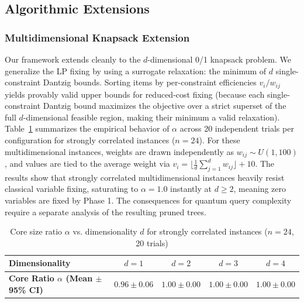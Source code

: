 \documentclass[conference]{IEEEtran} \IEEEoverridecommandlockouts
\begin{document}
\subsection{Algorithmic Extensions}



\subsubsection{Multidimensional Knapsack Extension}
Our framework extends cleanly to the $d$-dimensional 0/1 knapsack problem. We generalize the LP fixing by using a surrogate relaxation: the minimum of $d$ single-constraint Dantzig bounds. Sorting items by per-constraint efficiencies $v_i/w_{ij}$ yields provably valid upper bounds for reduced-cost fixing (because each single-constraint Dantzig bound maximizes the objective over a strict superset of the full $d$-dimensional feasible region, making their minimum a valid relaxation). Table~\ref{tab:multidim} summarizes the empirical behavior of $\alpha$ across 20 independent trials per configuration for strongly correlated instances ($n=24$). For these multidimensional instances, weights are drawn independently as $w_{ij} \sim U(1, 100)$, and values are tied to the average weight via $v_i = \lfloor \frac{1}{d} \sum_{j=1}^d w_{ij} \rfloor + 10$. The results show that strongly correlated multidimensional instances heavily resist classical variable fixing, saturating to $\alpha = 1.0$ instantly at $d \ge 2$, meaning zero variables are fixed by Phase 1. The consequences for quantum query complexity require a separate analysis of the resulting pruned trees.

\begin{table}[htbp]
\caption{Core size ratio $\alpha$ vs. dimensionality $d$ for strongly correlated instances ($n=24$, 20 trials)}
\label{tab:multidim}
\begin{center}
\begin{tabular}{lcccc}
\toprule
\textbf{Dimensionality} & $d=1$ & $d=2$ & $d=3$ & $d=4$ \\
\midrule
\textbf{Core Ratio $\alpha$ (Mean $\pm$ 95\% CI)} & $0.96 \pm 0.06$ & $1.00 \pm 0.00$ & $1.00 \pm 0.00$ & $1.00 \pm 0.00$ \\
\bottomrule
\end{tabular}
\end{center}
\end{table}

\end{document}
